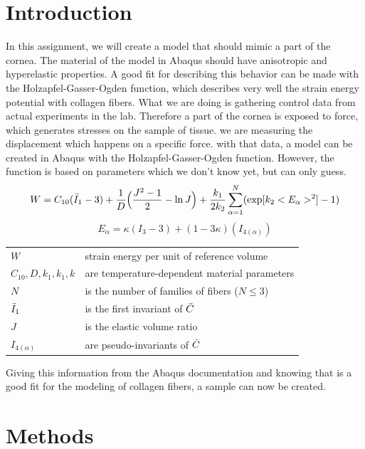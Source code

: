 \documentclass[12pt]{article}
\makeatletter
\newenvironment{conditions}
  {\par\vspace{\abovedisplayskip}\noindent\begin{tabular}{>{$}l<{$} @{${}={}$} l}}
  {\end{tabular}\par\vspace{\belowdisplayskip}}
\makeatother
\begin{document}
\tableofcontents
\pagebreak
\section{Introduction}
In this assignment, we will create a model that should mimic a part of the cornea. The material of the model in Abaqus should have anisotropic and hyperelastic properties. A good fit for describing this behavior can be made with the Holzapfel-Gasser-Ogden function, which describes very well the strain energy potential with collagen fibers.
What we are doing is gathering control data from actual experiments in the lab. Therefore a part of the cornea is exposed to force, which generates stresses on the sample of tissue. we are measuring the displacement which happens on a specific force. with that data, a model can be created in Abaqus with the Holzapfel-Gasser-Ogden function. However, the function is based on parameters which we don't know yet, but can only guess.
\begin{equation}\label{eq:holzapfel}
  W=C_{10}(\Bar{I}_{1}-3)+\frac{1}{D}\Big(\frac{J^{2}-1}{2}-\ln J\Big)+\frac{k_{1}}{2k_{2}}\sum_{\alpha=1}^{N}(\exp[k_{2}<E_{\alpha}>^{2}]-1)
\end{equation}
\begin{equation}\label{eq:holzapfel_e}
  E_{\alpha}=\kappa(I_{3}-3)+(1-3\kappa)(I_{4(\alpha)})
\end{equation}
\begin{conditions}
  W                             &  strain energy per unit of reference volume\\
  C_{10},D,k_{1},k_{1},k        &  are temperature-dependent material parameters\\
  N                             &  is the number of families of fibers ($N \leq 3$)\\   
  \Bar{I}_{1}                   &  is the first invariant of $\Bar{C}$ \cite{Holzapfel-Gasser-Ogden} \\
  J                             &  is the elastic volume ratio\\
  I_{4(\alpha)}                 &  are pseudo-invariants of $\Bar{C}$
\end{conditions}
Giving this information from the Abaqus documentation \cite{Holzapfel-Gasser-Ogden} and knowing that is a good fit for the modeling of collagen fibers, a sample can now be created.
\newpage
\section{Methods}
\end{document}
